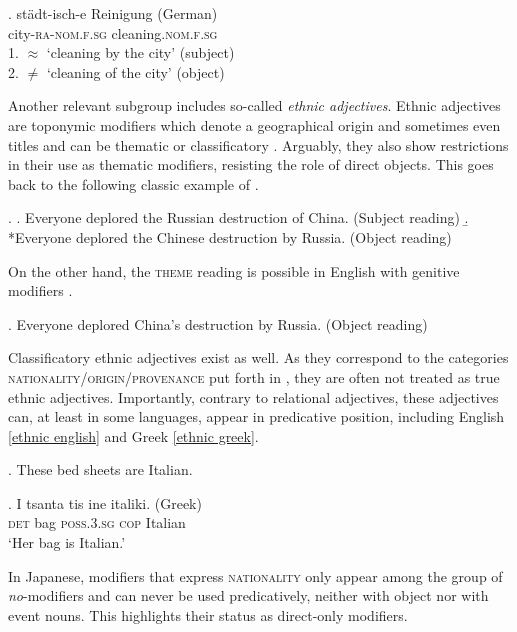 \exg. städt-isch-e Reinigung (German)\\
city-\textsc{ra-nom.f.sg} cleaning.\textsc{nom.f.sg}\\
1. $\approx$ `cleaning by the city' (subject) \\
2. $\neq$ `cleaning of the city' (object) \\ \null \hfill \citep[294]{gunkel:2008:constraints}

Another relevant subgroup includes so-called \textit{ethnic adjectives}. Ethnic adjectives are toponymic modifiers which denote a geographical origin and sometimes even titles and can be thematic or classificatory \citep{giorgi:1991:syntax, alex:2011:ea, arseni:2014:EA, kotowski:2016:adj}. Arguably, they also show restrictions in their use as thematic modifiers, resisting the role of direct objects. This goes back to the following classic example of \citet[111]{kayne:1981:ecp}.

\ex. \a. Everyone deplored the Russian destruction of China. (Subject reading)
\b. *Everyone deplored the Chinese destruction by Russia. (Object reading)

On the other hand, the \textsc{theme} reading is possible in English with genitive modifiers \citep{kayne:1981:ecp}.

\ex. Everyone deplored China's destruction by Russia. (Object reading)

Classificatory ethnic adjectives exist as well. As they correspond to the categories \textsc{nationality}/\textsc{origin}/\textsc{provenance} put forth in \citet{sproat:1991:the, scott:2002:stacked, laenzlinger:2005:french, cinque:2010:adj}, they are often not treated as true ethnic adjectives. Importantly, contrary to relational adjectives, these adjectives can, at least in some languages, appear in predicative position, including  English \ref{ethnic english} and  Greek \ref{ethnic greek}.

\ex. These bed sheets are Italian. \label{ethnic english}

\exg. I tsanta tis ine italiki. (Greek)\\
\textsc{det} bag \textsc{poss.3.sg} \textsc{cop} Italian\\
`Her bag is Italian.' \null \hfill \citep[138]{alex:2011:ea} \label{ethnic greek}

In Japanese, modifiers that express \textsc{nationality} only appear among the group of \textit{no}-modifiers and can never be used predicatively, neither with object nor with event nouns. This highlights their status as direct-only modifiers.

